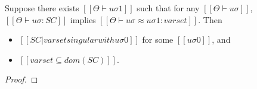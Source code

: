 \begin{lemma}
    \label{lemma:singularity-completeness}
    Suppose there exists $[[Θ ⊢ uσ1]]$ such that
    for any $[[Θ ⊢ uσ]]$, $[[Θ ⊢ uσ : SC]]$ implies $[[Θ ⊢ uσ ≈ uσ1 : varset]]$.
    Then 
    \begin{itemize}
        \item $[[SC|varset singular with uσ0]]$ for some $[[uσ0]]$, and
        \item $[[varset ⊆ dom(SC)]]$.
    \end{itemize} 
\end{lemma}
\begin{proof}
\end{proof}
